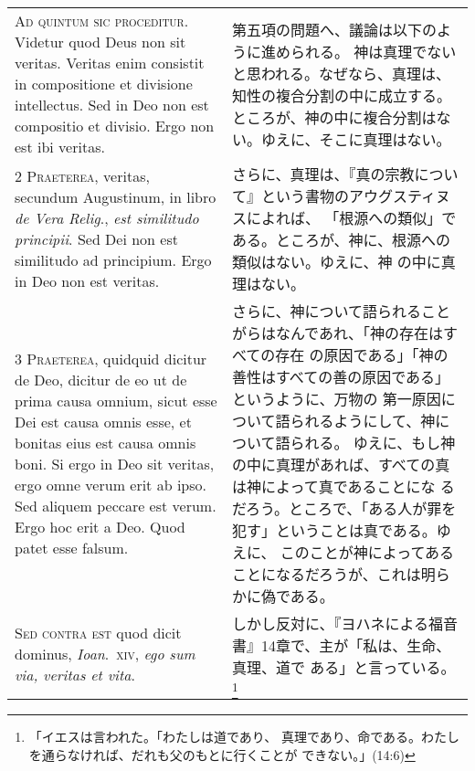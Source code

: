 \documentclass[10pt]{jsarticle} %
\begin{document}
\begin{longtable}{p{21em}p{21em}}


{\huge A}{\scshape d quintum sic proceditur}. Videtur quod Deus non sit
 veritas. Veritas enim consistit in compositione et divisione
 intellectus. Sed in Deo non est compositio et divisio. Ergo non est ibi
 veritas.


&

第五項の問題へ、議論は以下のように進められる。
神は真理でないと思われる。なぜなら、真理は、知性の複合分割の中に成立する。
 ところが、神の中に複合分割はない。ゆえに、そこに真理はない。

\\




{\scshape 2 Praeterea}, veritas, secundum Augustinum, in libro {\itshape
 de Vera Relig}., {\itshape est similitudo principii}. Sed Dei non est
 similitudo ad principium. Ergo in Deo non est veritas.


&

さらに、真理は、『真の宗教について』という書物のアウグスティヌスによれば、
 「根源への類似」である。ところが、神に、根源への類似はない。ゆえに、神
 の中に真理はない。

\\




{\scshape 3 Praeterea}, quidquid dicitur de Deo, dicitur de eo ut de
 prima causa omnium, sicut esse Dei est causa omnis esse, et bonitas
 eius est causa omnis boni. Si ergo in Deo sit veritas, ergo omne verum
 erit ab ipso. Sed aliquem peccare est verum. Ergo hoc erit a Deo. Quod
 patet esse falsum.


&

さらに、神について語られることがらはなんであれ、「神の存在はすべての存在
 の原因である」「神の善性はすべての善の原因である」というように、万物の
 第一原因について語られるようにして、神について語られる。
ゆえに、もし神の中に真理があれば、すべての真は神によって真であることにな
 るだろう。ところで、「ある人が罪を犯す」ということは真である。ゆえに、
 このことが神によってあることになるだろうが、これは明らかに偽である。

\\




{\scshape Sed contra est} quod dicit dominus, {\itshape Ioan}.~{\scshape xiv}, {\itshape ego sum via, veritas et vita}.


&

しかし反対に、『ヨハネによる福音書』14章で、主が「私は、生命、真理、道で
 ある」と言っている。\footnote{「イエスは言われた。「わたしは道であり、
 真理であり、命である。わたしを通らなければ、だれも父のもとに行くことが
 できない。」(14:6)}
 


\end{longtable}
\end{document}

